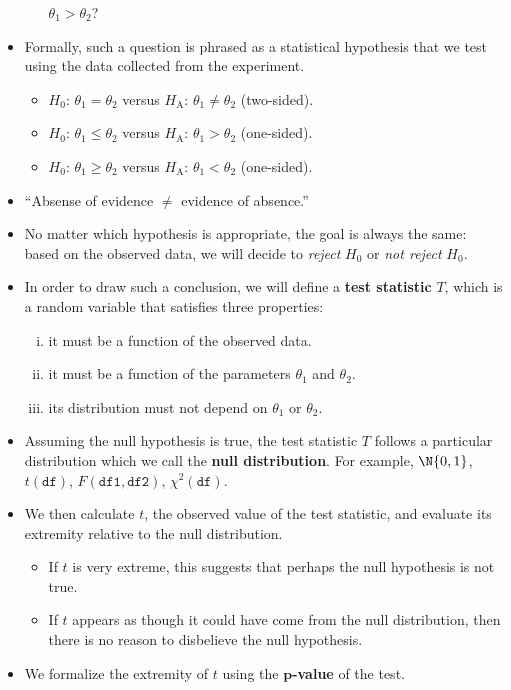 \begin{itemize}
\begin{itemize}
                        $ \theta_1>\theta_2 $?
            \end{itemize}
      \item Formally, such a question is phrased as a statistical hypothesis that we test using
            the data collected from the experiment.
            \begin{itemize}
                  \item $ H_0 $: $ \theta_1=\theta_2 $ versus $ H_\text{A} $: $ \theta_1\ne\theta_2 $ (two-sided).
                  \item $ H_0 $: $ \theta_1\le\theta_2 $ versus $ H_\text{A} $: $ \theta_1>\theta_2 $ (one-sided).
                  \item $ H_0 $: $ \theta_1\ge\theta_2 $ versus $ H_\text{A} $: $ \theta_1<\theta_2 $ (one-sided).
            \end{itemize}
      \item ``Absense of evidence $ \ne  $ evidence of absence.''
      \item No matter which hypothesis is appropriate, the goal is always the same: based on the
            observed data, we will decide to \emph{reject} $ H_0 $ or \emph{not reject} $ H_0 $.
      \item In order to draw such a conclusion, we will define a \textbf{test statistic} $ T $,
            which is a random variable that satisfies three properties:
            \begin{enumerate}[(i)]
                  \item it must be a function of the observed data.
                  \item it must be a function of the parameters $ \theta_1 $ and $ \theta_2 $.
                  \item its distribution must not depend on $ \theta_1 $ or $ \theta_2 $.
            \end{enumerate}
      \item Assuming the null hypothesis is true, the test statistic $ T $ follows
            a particular distribution which we call the \textbf{null distribution}.
            For example, $ \N{0,1} $, $ t(\texttt{df}) $,
            $ F(\texttt{df1}, \texttt{df2}) $, $ \chi^2(\texttt{df}) $.
      \item We then calculate $ t $, the observed value of the test statistic, and evaluate its extremity
            relative to the null distribution.
            \begin{itemize}
                  \item If $ t $ is very extreme, this suggests that perhaps the null hypothesis
                        is not true.
                  \item If $ t $ appears as though it could have come from the null distribution, then
                        there is no reason to disbelieve the null hypothesis.
            \end{itemize}
      \item We formalize the extremity of $ t $ using the \textbf{$ \symbf{p} $-value} of the test.


\end{itemize}
